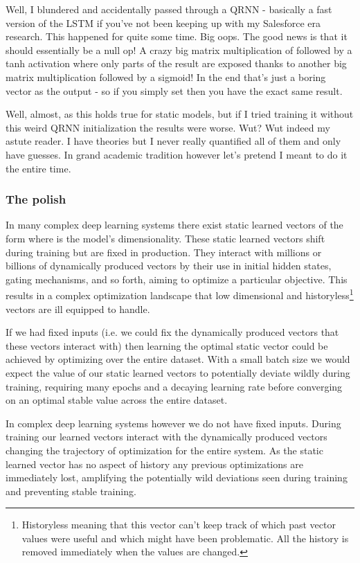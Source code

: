 \documentclass{article}
\begin{document}
Well, I blundered and accidentally passed  through a QRNN - basically a fast version of the LSTM if you've not been keeping up with my Salesforce era research.
This happened for quite some time.
Big oops.
The good news is that it should essentially be a null op!
A crazy big matrix multiplication of  followed by a tanh activation where only parts of the result are exposed thanks to another big matrix multiplication followed by a sigmoid!
In the end that's just a boring vector as the output - so if you simply set  then you have the exact same result.

Well, almost, as this holds true for static models, but if I tried training it without this weird QRNN initialization the results were worse.
Wut?
Wut indeed my astute reader.
I have theories but I never really quantified all of them and only have guesses.
In grand academic tradition however let's pretend I meant to do it the entire time.

\subsubsection{The polish}

In many complex deep learning systems there exist static learned vectors of the form  where  is the model's dimensionality.
These static learned vectors shift during training but are fixed in production.
They interact with millions or billions of dynamically produced vectors by their use in initial hidden states, gating mechanisms, and so forth, aiming to optimize a particular objective.
This results in a complex optimization landscape that low dimensional and historyless\footnote{Historyless meaning that this vector can't keep track of which past vector values were useful and which might have been problematic. All the history is removed immediately when the values are changed.} vectors are ill equipped to handle.

If we had fixed inputs (i.e. we could fix the dynamically produced vectors that these vectors interact with) then learning the optimal static vector could be achieved by optimizing over the entire dataset.
With a small batch size we would expect the value of our static learned vectors to potentially deviate wildly during training, requiring many epochs and a decaying learning rate before converging on an optimal stable value across the entire dataset.

In complex deep learning systems however we do not have fixed inputs.
During training our learned vectors interact with the dynamically produced vectors changing the trajectory of optimization for the entire system.
As the static learned vector has no aspect of history any previous optimizations are immediately lost, amplifying the potentially wild deviations seen during training and preventing stable training.
\end{document}
